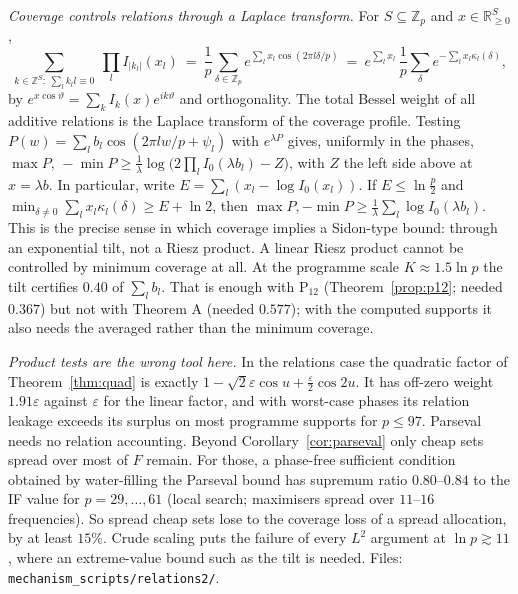 \documentclass[11pt]{article}
\theoremstyle{definition}
\begin{document}
\emph{Coverage controls relations through a Laplace transform.}  For $S\subseteq\mathbb Z_p$ and $x\in\mathbb R^S_{\ge0}$,
\[\sum_{k\in\mathbb Z^S:\ \sum_lk_ll\equiv0}\ \prod_lI_{|k_l|}(x_l)\ =\ \frac1p\sum_{\delta\in\mathbb Z_p}e^{\sum_lx_l\cos(2\pi l\delta/p)}\ =\ e^{\sum_lx_l}\,\frac1p\sum_\delta e^{-\sum_lx_l\kappa_l(\delta)},\]
by $e^{x\cos\vartheta}=\sum_kI_k(x)e^{ik\vartheta}$ and orthogonality.  The total Bessel weight of all additive relations is the Laplace transform of the
coverage profile.  Testing $P(w)=\sum_lb_l\cos(2\pi lw/p+\psi_l)$ with $e^{\lambda P}$ gives, uniformly in the phases,
$\max P,\,-\min P\ge\frac1\lambda\log\big(2\prod_lI_0(\lambda b_l)-Z\big)$, with $Z$ the left side above at $x=\lambda b$.  In particular, write $E=\sum_l(x_l-\log I_0(x_l))$.  If
$E\le\ln\frac p2$ and $\min_{\delta\ne0}\sum_lx_l\kappa_l(\delta)\ge E+\ln2$, then $\max P,-\min P\ge\frac1\lambda\sum_l\log I_0(\lambda b_l)$.  This is the precise sense in which
coverage implies a Sidon-type bound: through an exponential tilt, not a Riesz product.  A linear Riesz product cannot be controlled by minimum
coverage at all.  At the programme scale $K\approx1.5\ln p$ the tilt certifies $0.40$ of $\sum_lb_l$.  That is enough with P$_{12}$ (Theorem~\ref{prop:p12}; needed $0.367$) but not with
Theorem A (needed $0.577$); with the computed supports it also needs the averaged rather than the minimum coverage.

\emph{Product tests are the wrong tool here.}  In the relations case the quadratic factor of Theorem~\ref{thm:quad} is exactly
$1-\sqrt2\varepsilon\cos u+\frac\varepsilon2\cos2u$.  It has off-zero weight $1.91\varepsilon$ against $\varepsilon$ for the linear factor, and with worst-case phases
its relation leakage exceeds its surplus on most programme supports for $p\le97$.  Parseval needs no relation accounting.  Beyond Corollary~\ref{cor:parseval}
only cheap sets spread over most of $F$ remain.  For those, a phase-free sufficient condition obtained by water-filling the Parseval bound has
supremum ratio $0.80$--$0.84$ to the IF value for $p=29,\dots,61$ (local search; maximisers spread over $11$--$16$ frequencies).  So spread cheap sets
lose to the coverage loss of a spread allocation, by at least $15\%$.  Crude scaling puts the failure of every $L^2$ argument at $\ln p\gtrsim11$, where an
extreme-value bound such as the tilt is needed.  Files: \texttt{mechanism\_scripts/relations2/}.
\end{document}
